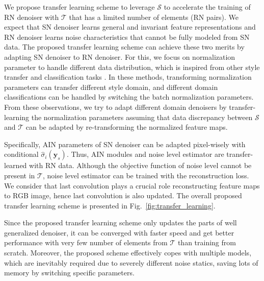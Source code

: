 \documentclass[10pt,twocolumn,letterpaper]{article}
\begin{document}
We propose transfer learning scheme to leverage $\mathcal{S}$ to accelerate the training of RN denoiser with $\mathcal{T}$ that has a limited number of elements (RN pairs). 
We expect that SN denoiser learns general and invariant feature representations  
and RN denoiser learns noise characteristics that cannot be fully modeled from SN data.
The proposed transfer learning scheme can achieve these two merits by adapting SN denoiser to RN denoiser.
For this, we focus on normalization parameter to handle different data distribution, which is inspired from other style transfer and classification tasks \cite{ulyanov2016instance,huang2017arbitrary, park2019semantic}. In these methods, transforming normalization parameters can transfer different style domain, and different domain classifications can be handled by switching the batch normalization parameters.
From these observations, we try to adapt different domain denoisers by transfer-learning the normalization parameters assuming that data discrepancy between  $\mathcal{S}$ and $\mathcal{T}$ can be adapted by re-transforming the normalized feature maps.

Specifically, AIN parameters of SN denoiser can be adapted pixel-wisely with conditional $\hat{\sigma}_i(\textbf{y}_s)$.
Thus, AIN modules and noise level estimator are transfer-learned with RN data.
Although the objective function of noise level cannot be present in $\mathcal{T}$, noise level estimator can be trained with the reconstruction loss.
We consider that last convolution plays a crucial role reconstructing feature maps to RGB image, hence last convolution is also updated. 
The overall proposed transfer learning scheme is presented in Fig.~\ref{fig:transfer_learning}.

Since the proposed transfer learning scheme only updates the parts of well generalized denoiser, it can be converged with faster speed and get better performance with very few number of elements from $\mathcal{T}$ than training from scratch. 
Moreover, the proposed scheme effectively copes with multiple models, which are inevitably required due to severely different noise statics, saving lots of memory by switching specific parameters.
\end{document}
